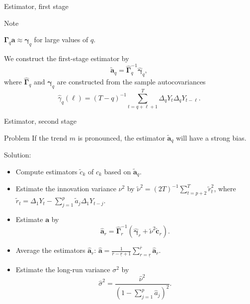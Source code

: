 \documentclass[10pt]{beamer}
\begin{document}
\begin{frame}{Estimator, first stage}

\begin{block}{Note}
\vspace{-3mm}
\begin{center}
$\boldsymbol{\Gamma}_q \boldsymbol{a} \approx \boldsymbol{\gamma}_q$ for large values of $q$.
\vspace{-3mm}
\end{center}\end{block}\pause

We construct the first-stage estimator by
\begin{equation*}
\widetilde{\boldsymbol{a}}_q = \widehat{\boldsymbol{\Gamma}}_q^{-1} \widehat{\boldsymbol{\gamma}}_q, 
\end{equation*}
where $\widehat{\boldsymbol{\Gamma}}_q$ and $\widehat{\boldsymbol{\gamma}}_q$ are constructed from the sample autocovariances $$\widehat{\gamma}_q(\ell) = (T-q)^{-1} \sum_{t=q+\ell+1}^T \Delta_q Y_{t} \Delta_q Y_{t-\ell}.$$ 
\end{frame}



\begin{frame}{Estimator, second stage}
\begin{block}{Problem}
If the trend $m$ is pronounced, the estimator $\widetilde{\boldsymbol{a}}_q$ will have a strong bias.
\end{block}\pause
\vspace{-2mm}
Solution:
\begin{itemize}
	\item \vspace{-2mm} Compute estimators $\widetilde{c}_k$ of $c_k$ based on $\widetilde{\boldsymbol{a}}_q$.\pause
	\item Estimate the innovation variance $\nu^2$ by $\widetilde{\nu}^2 = (2T)^{-1} \sum_{t=p+2}^T \widetilde{r}_{t}^2$, where $\widetilde{r}_{t} = \Delta_1 Y_{t} - \sum_{j=1}^p \widetilde{a}_j \Delta_1 Y_{t-j}$.\pause
	\item Estimate $\boldsymbol{a}$ by 
\begin{equation*}\label{est-AR-SS} 
\widehat{\boldsymbol{a}}_r = \widehat{\boldsymbol{\Gamma}}_r^{-1} (\widehat{\boldsymbol{\gamma}}_r + \widetilde{\nu}^2 \widetilde{\boldsymbol{c}}_r).
\end{equation*}\pause
	\item \vspace{-4mm} Average the estimators $\widehat{\boldsymbol{a}}_r$: $\widehat{\boldsymbol{a}} = \frac{1}{\overline{r} - \underline{r} + 1} \sum\limits_{r=\underline{r}}^{\overline{r}} \widehat{\boldsymbol{a}}_r$.\pause
	\item Estimate the long-run variance $\sigma^2$ by 
\begin{equation*} \label{est-lrv}
\widehat{\sigma}^2 = \frac{\widehat{\nu}^2}{(1 - \sum_{j=1}^p \widehat{a}_j)^2}. 
\end{equation*}
\end{itemize}
\end{frame}
\end{document}
